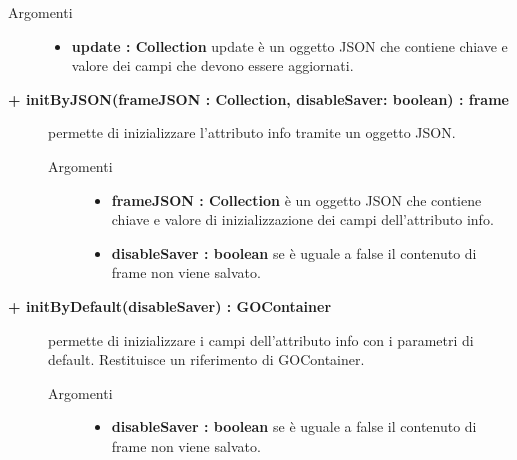 \begin{description}
\begin{description}
		\begin{description}
			\item[Argomenti] \hfill
				\begin{itemize}
				
					\item \textbf{update : Collection			} \hfill
					update è un oggetto JSON che contiene chiave e valore dei campi che devono essere aggiornati. 
				\end{itemize}
		\end{description}

\end{description}

\begin{description}
		\item[\textbf{\color{blue}+ initByJSON(frameJSON : Collection, disableSaver: boolean) : frame			}] \hfill
			permette di inizializzare l'attributo info tramite un oggetto JSON. 
			
		\begin{description}
			\item[Argomenti] \hfill
				\begin{itemize}
				
					\item \textbf{frameJSON : Collection			} \hfill
					è un oggetto JSON che contiene chiave e valore di inizializzazione dei campi dell'attributo info. 
					\item \textbf{disableSaver : boolean			} \hfill
					se è uguale a false il contenuto di frame non viene salvato. %
				\end{itemize}
		\end{description}

\end{description}

\begin{description}
		\item[\textbf{\color{blue}+ initByDefault(disableSaver) : GOContainer			}] \hfill
			permette di inizializzare i campi dell'attributo info con i parametri di default. Restituisce un riferimento di GOContainer. 

\begin{description}
			\item[Argomenti] \hfill
				\begin{itemize}
						\item \textbf{disableSaver : boolean			} \hfill
					se è uguale a false il contenuto di frame non viene salvato. %
				\end{itemize}


\end{description}
\end{description}
\end{description}
